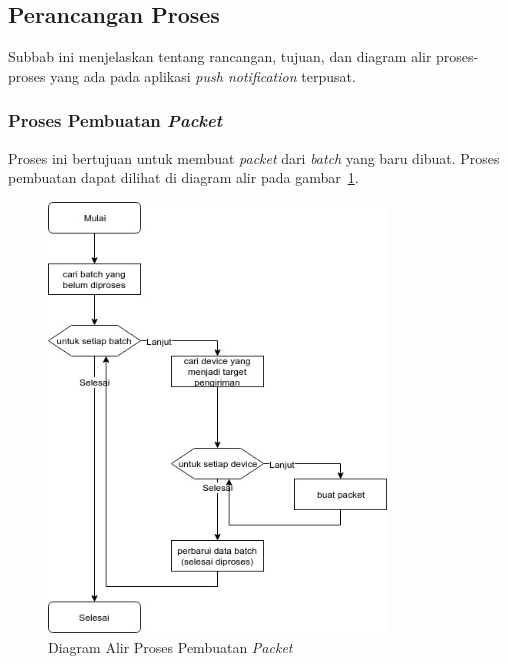 \subsection{Perancangan Proses}
\par Subbab ini menjelaskan tentang rancangan, tujuan, dan diagram alir proses-proses yang ada pada aplikasi
\textit{push notification} terpusat.

\subsubsection{Proses Pembuatan \textit{Packet}}
\par Proses ini bertujuan untuk membuat \textit{packet} dari \textit{batch} yang baru dibuat.
Proses pembuatan dapat
dilihat di diagram alir pada gambar~\ref{flowchart_pembuatan_packet}.
\begin{figure}[!ht]
    \centering\includegraphics[width=0.8\textwidth]{bab3/figures/flowchart_pembuatan_packet.jpg}
    \caption{Diagram Alir Proses Pembuatan \textit{Packet}}
    \label{flowchart_pembuatan_packet}
\end{figure}

